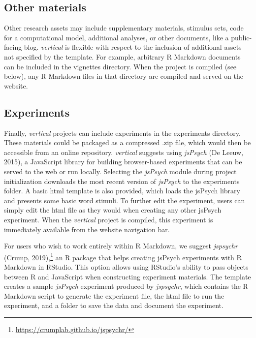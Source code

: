 \documentclass[
  english,
  jou,floatsintext]{apa6}
\begin{document}
\hypertarget{other-materials}{%
\subsection{Other materials}\label{other-materials}}

Other research assets may include supplementary materials, stimulus sets, code for a computational model, additional analyses, or other documents, like a public-facing blog. \emph{vertical} is flexible with respect to the inclusion of additional assets not specified by the template. For example, arbitrary R Markdown documents can be included in the vignettes directory. When the project is compiled (see below), any R Markdown files in that directory are compiled and served on the website.

\hypertarget{experiments}{%
\subsection{Experiments}\label{experiments}}

Finally, \emph{vertical} projects can include experiments in the experiments directory. These materials could be packaged as a compressed .zip file, which would then be accessible from an online repository. \emph{vertical} suggests using \emph{jsPsych} (De Leeuw, 2015), a JavaScript library for building browser-based experiments that can be served to the web or run locally. Selecting the \emph{jsPsych} module during project initialization downloads the most recent version of \emph{jsPsych} to the experiments folder. A basic html template is also provided, which loads the jsPsych library and presents some basic word stimuli. To further edit the experiment, users can simply edit the html file as they would when creating any other jsPsych experiment. When the \emph{vertical} project is compiled, this experiment is immediately available from the website navigation bar.

For users who wish to work entirely within R Markdown, we suggest \emph{jspsychr} (Crump, 2019),\footnote{\url{https://crumplab.github.io/jspsychr/}} an R package that helps creating jsPsych experiments with R Markdown in RStudio. This option allows using RStudio's ability to pass objects between R and JavaScript when constructing experiment materials. The template creates a sample \emph{jsPsych} experiment produced by \emph{jspsychr}, which contains the R Markdown script to generate the experiment file, the html file to run the experiment, and a folder to save the data and document the experiment.
\end{document}
